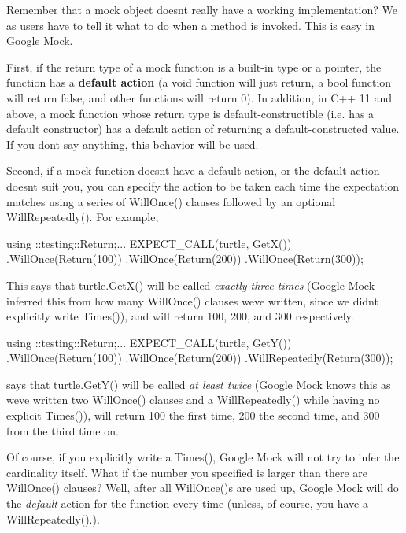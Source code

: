 Remember that a mock object doesn\textquotesingle{}t really have a working implementation? We as users have to tell it what to do when a method is invoked. This is easy in Google Mock.

First, if the return type of a mock function is a built-\/in type or a pointer, the function has a {\bfseries default action} (a {\ttfamily void} function will just return, a {\ttfamily bool} function will return {\ttfamily false}, and other functions will return 0). In addition, in C++ 11 and above, a mock function whose return type is default-\/constructible (i.\+e. has a default constructor) has a default action of returning a default-\/constructed value. If you don\textquotesingle{}t say anything, this behavior will be used.

Second, if a mock function doesn\textquotesingle{}t have a default action, or the default action doesn\textquotesingle{}t suit you, you can specify the action to be taken each time the expectation matches using a series of {\ttfamily Will\+Once()} clauses followed by an optional {\ttfamily Will\+Repeatedly()}. For example,


\begin{DoxyCode}
using ::testing::Return;...
EXPECT\_CALL(turtle, GetX())
    .WillOnce(Return(100))
    .WillOnce(Return(200))
    .WillOnce(Return(300));
\end{DoxyCode}


This says that {\ttfamily turtle.\+Get\+X()} will be called {\itshape exactly three times} (Google Mock inferred this from how many {\ttfamily Will\+Once()} clauses we\textquotesingle{}ve written, since we didn\textquotesingle{}t explicitly write {\ttfamily Times()}), and will return 100, 200, and 300 respectively.


\begin{DoxyCode}
using ::testing::Return;...
EXPECT\_CALL(turtle, GetY())
    .WillOnce(Return(100))
    .WillOnce(Return(200))
    .WillRepeatedly(Return(300));
\end{DoxyCode}


says that {\ttfamily turtle.\+Get\+Y()} will be called {\itshape at least twice} (Google Mock knows this as we\textquotesingle{}ve written two {\ttfamily Will\+Once()} clauses and a {\ttfamily Will\+Repeatedly()} while having no explicit {\ttfamily Times()}), will return 100 the first time, 200 the second time, and 300 from the third time on.

Of course, if you explicitly write a {\ttfamily Times()}, Google Mock will not try to infer the cardinality itself. What if the number you specified is larger than there are {\ttfamily Will\+Once()} clauses? Well, after all {\ttfamily Will\+Once()}s are used up, Google Mock will do the {\itshape default} action for the function every time (unless, of course, you have a {\ttfamily Will\+Repeatedly()}.).

